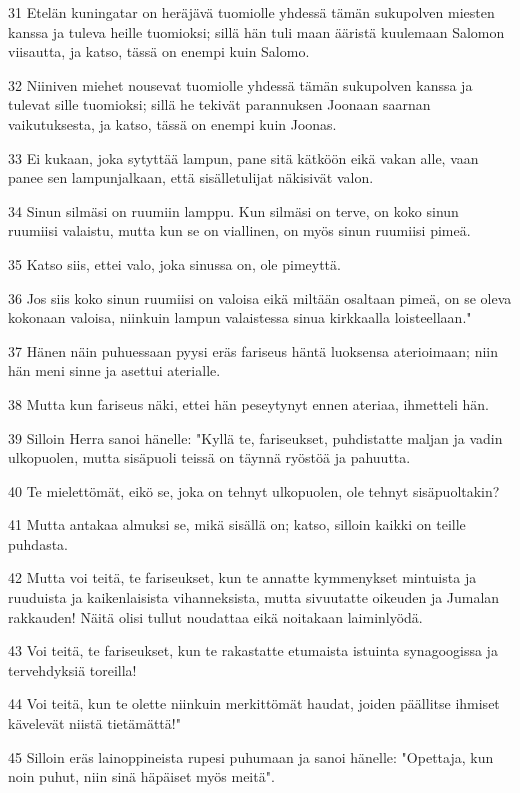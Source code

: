 \par 31 Etelän kuningatar on heräjävä tuomiolle yhdessä tämän sukupolven miesten kanssa ja tuleva heille tuomioksi; sillä hän tuli maan ääristä kuulemaan Salomon viisautta, ja katso, tässä on enempi kuin Salomo.
\par 32 Niiniven miehet nousevat tuomiolle yhdessä tämän sukupolven kanssa ja tulevat sille tuomioksi; sillä he tekivät parannuksen Joonaan saarnan vaikutuksesta, ja katso, tässä on enempi kuin Joonas.
\par 33 Ei kukaan, joka sytyttää lampun, pane sitä kätköön eikä vakan alle, vaan panee sen lampunjalkaan, että sisälletulijat näkisivät valon.
\par 34 Sinun silmäsi on ruumiin lamppu. Kun silmäsi on terve, on koko sinun ruumiisi valaistu, mutta kun se on viallinen, on myös sinun ruumiisi pimeä.
\par 35 Katso siis, ettei valo, joka sinussa on, ole pimeyttä.
\par 36 Jos siis koko sinun ruumiisi on valoisa eikä miltään osaltaan pimeä, on se oleva kokonaan valoisa, niinkuin lampun valaistessa sinua kirkkaalla loisteellaan."
\par 37 Hänen näin puhuessaan pyysi eräs fariseus häntä luoksensa aterioimaan; niin hän meni sinne ja asettui aterialle.
\par 38 Mutta kun fariseus näki, ettei hän peseytynyt ennen ateriaa, ihmetteli hän.
\par 39 Silloin Herra sanoi hänelle: "Kyllä te, fariseukset, puhdistatte maljan ja vadin ulkopuolen, mutta sisäpuoli teissä on täynnä ryöstöä ja pahuutta.
\par 40 Te mielettömät, eikö se, joka on tehnyt ulkopuolen, ole tehnyt sisäpuoltakin?
\par 41 Mutta antakaa almuksi se, mikä sisällä on; katso, silloin kaikki on teille puhdasta.
\par 42 Mutta voi teitä, te fariseukset, kun te annatte kymmenykset mintuista ja ruuduista ja kaikenlaisista vihanneksista, mutta sivuutatte oikeuden ja Jumalan rakkauden! Näitä olisi tullut noudattaa eikä noitakaan laiminlyödä.
\par 43 Voi teitä, te fariseukset, kun te rakastatte etumaista istuinta synagoogissa ja tervehdyksiä toreilla!
\par 44 Voi teitä, kun te olette niinkuin merkittömät haudat, joiden päällitse ihmiset kävelevät niistä tietämättä!"
\par 45 Silloin eräs lainoppineista rupesi puhumaan ja sanoi hänelle: "Opettaja, kun noin puhut, niin sinä häpäiset myös meitä".
